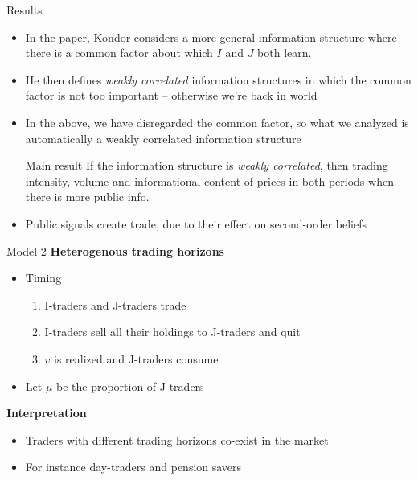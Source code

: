 \documentclass[english,10pt
,aspectratio=169
]{beamer}
\begin{document}
\begin{frame}{Results}
	\begin{itemize}
		\item In the paper, Kondor considers a more general information structure where there is a common factor about which $I$ and $J$ both learn.
		\item He then defines \textit{weakly correlated} information structures in which the common factor  is not too important -- otherwise we're back in \citet{brown_technical_1989} world
		\item In the above, we have disregarded the common factor, so what we analyzed is automatically a weakly correlated information structure
		\begin{block}{Main result}
			If the information structure is \textit{weakly correlated}, then trading intensity, volume and informational content of prices  in both periods when there is more public info.
		\end{block}
		\item Public signals  create trade, due to their effect on second-order beliefs
	\end{itemize}
\end{frame}


\begin{frame}{Model 2}
	\textbf{Heterogenous trading horizons}
	\begin{itemize}
		\item Timing
		\begin{enumerate}
			\item I-traders and J-traders trade
			\item I-traders sell all their holdings to J-traders and quit
			\item $v$ is realized and J-traders consume
		\end{enumerate}
		\item Let $\mu$ be the proportion of J-traders
	\end{itemize}
	\textbf{Interpretation}
	\begin{itemize}
		\item Traders with different trading horizons co-exist in the market
		\item For instance day-traders and pension savers
	\end{itemize}
\end{frame}
\end{document}
